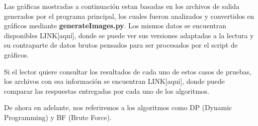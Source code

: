

Las gráficas mostradas a continuación estan basadas en los archivos de salida generados por el programa principal, los cuales fueron analizados y convertidos en gráficos mediante \textbf{generateImages.py}. Los mismos datos se encuentran disponibles LINK[aquí], donde se puede ver sus versiones adaptadas a la lectura y su contraparte de datos brutos 
pensados para ser procesados por el script de gráficos.

Si el lector quiere consultar los resultados de cada uno de estos casos de pruebas, los archivos con esa información se encuentran 
LINK[aqui], donde puede comparar las respuestas entregadas por cada uno de los algoritmos.

De ahora en adelante, nos referiremos a los algoritmos como DP (Dynamic Programming) y BF (Brute Force).

